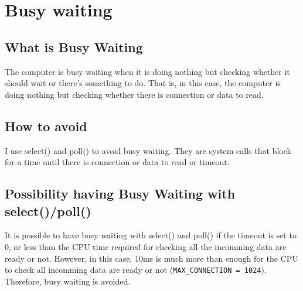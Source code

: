 \section{Busy waiting}

\subsection{What is Busy Waiting}
The computer is busy waiting when it is doing nothing but checking whether it should wait or there's something to do. That is, in this case, the computer is doing nothing but checking whether there is connection or data to read.

\subsection{How to avoid}
I use select() and poll() to avoid busy waiting. They are system calls that block for a time until there is connection or data to read or timeout.

\subsection{Possibility having Busy Waiting with select()/poll()}
It is possible to have busy waiting with select() and poll() if the timeout is set to 0, or less than the CPU time required for checking all the incomming data are ready or not. However, in this case, 10ms is much more than enough for the CPU to check all incomming data are ready or not (\verb|MAX_CONNECTION = 1024|). Therefore, busy waiting is avoided.